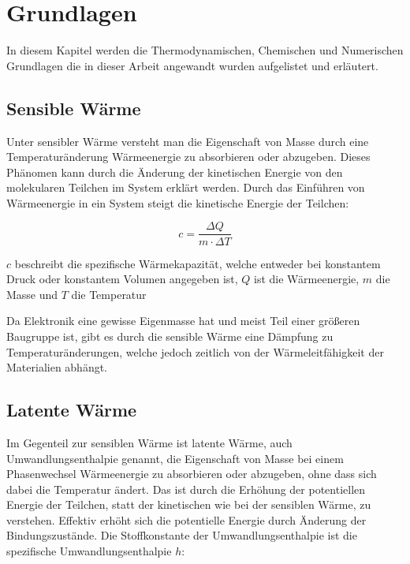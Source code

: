 \chapter{Grundlagen}
\label{chap:Grundlagen}			%

In diesem Kapitel werden die Thermodynamischen, Chemischen und Numerischen Grundlagen die in dieser Arbeit angewandt wurden aufgelistet
und erläutert.

\section{Sensible Wärme}\label{sec:sensiblewaerme}
Unter sensibler Wärme versteht man die Eigenschaft von Masse durch eine Temperaturänderung Wärmeenergie zu absorbieren oder abzugeben. Dieses
Phänomen kann durch die Änderung der kinetischen Energie von den molekularen Teilchen im System erklärt werden. Durch das Einführen von
Wärmeenergie in ein System steigt die kinetische Energie der Teilchen:

\begin{equation}
    c = \frac{\Delta Q}{m \cdot \Delta T}
\end{equation}

$c$ beschreibt die spezifische Wärmekapazität, welche entweder bei konstantem Druck oder konstantem Volumen angegeben ist,
$Q$ ist die Wärmeenergie, $m$ die Masse und $T$ die Temperatur

Da Elektronik eine gewisse Eigenmasse hat und meist Teil einer größeren Baugruppe ist, gibt es durch die sensible Wärme eine Dämpfung
zu Temperaturänderungen, welche jedoch zeitlich von der Wärmeleitfähigkeit der Materialien abhängt.

\section{Latente Wärme}\label{sec:latentewaerme}

Im Gegenteil zur sensiblen Wärme ist latente Wärme, auch Umwandlungsenthalpie genannt, die Eigenschaft von Masse bei einem Phasenwechsel Wärmeenergie
zu absorbieren oder abzugeben, ohne dass sich dabei die Temperatur ändert. Das ist durch die Erhöhung der potentiellen Energie der Teilchen,
statt der kinetischen wie bei der sensiblen Wärme, zu verstehen. Effektiv erhöht sich die potentielle Energie durch Änderung der Bindungszustände.
Die Stoffkonstante der Umwandlungsenthalpie ist die spezifische Umwandlungsenthalpie $h$:


